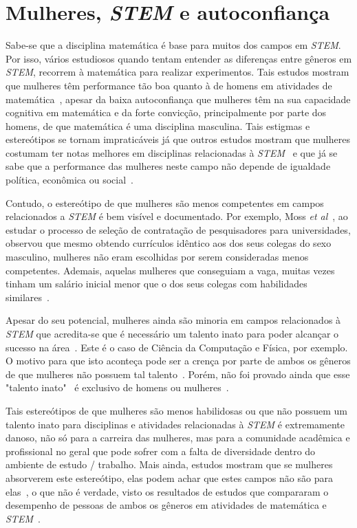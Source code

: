 \section{Mulheres, \emph{STEM} e autoconfiança}

Sabe-se que a disciplina matemática é base para muitos dos campos em \emph{STEM}. Por isso, vários estudiosos quando tentam entender as diferenças entre gêneros em \emph{STEM}, recorrem à matemática para realizar experimentos. Tais estudos mostram que mulheres têm performance tão boa quanto à de homens em atividades de matemática~\cite{hyde1990gender,campbell1986effects}, apesar da baixa autoconfiança que mulheres têm na sua capacidade cognitiva em matemática e da forte convicção, principalmente por parte dos homens, de que matemática é uma disciplina masculina. Tais estigmas e estereótipos se tornam impraticáveis já que outros estudos mostram que mulheres costumam ter notas melhores em disciplinas relacionadas à \emph{STEM}~\cite{stoet2015sex} e que já se sabe que a performance das mulheres neste campo não depende de igualdade política, econômica ou social~\cite{stoet2015sex}. 

Contudo, o estereótipo de que mulheres são menos competentes em campos relacionados a \emph{STEM} é bem visível e documentado. Por exemplo, Moss \emph{et al}~\cite{moss2012science}, ao estudar o processo de seleção de contratação de pesquisadores para universidades, observou que mesmo obtendo currículos idêntico aos dos seus colegas do sexo masculino, mulheres não eram escolhidas por serem consideradas menos competentes. Ademais, aquelas mulheres que conseguiam a vaga, muitas vezes tinham um salário inicial menor que o dos seus colegas com habilidades similares~\cite{moss2012science}.

\bigskip

Apesar do seu potencial, mulheres ainda são minoria em campos relacionados à \emph{STEM} que acredita-se que é necessário um talento inato para poder alcançar o sucesso na área~\cite{leslie2015expectations}. Este é o caso de Ciência da Computação e Física, por exemplo. O motivo para que isto aconteça pode ser a crença por parte de ambos os gêneros de que mulheres não possuem tal talento~\cite{tiedemann2000gender,kirkcaldy2007parental}. Porém, não foi provado ainda que esse "talento inato" \ é exclusivo de homens ou mulheres~\cite{hyde2005gender}. 

Tais estereótipos de que mulheres são menos habilidosas ou que não possuem um talento inato para disciplinas e atividades relacionadas à \emph{STEM} é extremamente danoso, não só para a carreira das mulheres, mas para a comunidade acadêmica e profissional no geral que pode sofrer com a falta de diversidade dentro do ambiente de estudo / trabalho. Mais ainda, estudos mostram que se mulheres absorverem este estereótipo, elas podem achar que estes campos não são para elas~\cite{wigfield2000expectancy,shapiro2011major}, o que não é verdade, visto os resultados de estudos que compararam o desempenho de pessoas de ambos os gêneros em atividades de matemática e \emph{STEM}~\cite{stoet2015sex,hyde1990gender,campbell1986effects}.

